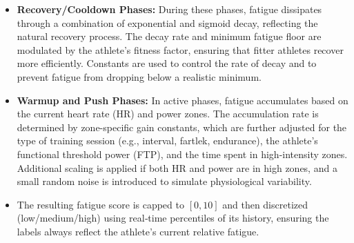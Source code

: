 \begin{itemize}
    \item \textbf{Recovery/Cooldown Phases:} During these phases, fatigue dissipates through a combination of exponential and sigmoid decay, reflecting the natural recovery process. The decay rate and minimum fatigue floor are modulated by the athlete's fitness factor, ensuring that fitter athletes recover more efficiently. Constants are used to control the rate of decay and to prevent fatigue from dropping below a realistic minimum.
    \item \textbf{Warmup and Push Phases:} In active phases, fatigue accumulates based on the current heart rate (HR) and power zones. The accumulation rate is determined by zone-specific gain constants, which are further adjusted for the type of training session (e.g., interval, fartlek, endurance), the athlete's functional threshold power (FTP), and the time spent in high-intensity zones. Additional scaling is applied if both HR and power are in high zones, and a small random noise is introduced to simulate physiological variability.
    \item The resulting fatigue score is capped to \([0,10]\) and then discretized (low/medium/high) using real‐time percentiles of its history, ensuring the labels always reflect the athlete’s current relative fatigue.
\end{itemize}

